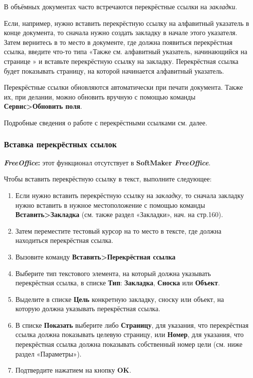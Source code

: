 ﻿\documentclass[a4paper,10pt]{article}
\begin{document}
 В объёмных документах часто встречаются перекрёстные ссылки на \textit{закладки}.
 
 Если, например, нужно вставить перекрёстную ссылку на алфавитный указатель в конце документа, то сначала нужно создать закладку в начале этого указателя. Затем вернитесь в то место в документе, где должна появиться перекрёстная ссылка, введите что-то типа «Также см. алфавитный указатель, начинающийся на странице » и вставьте перекрёстную ссылку на закладку. Перекрёстная ссылка будет показывать страницу, на которой начинается алфавитный указатель.
 
 Перекрёстные ссылки обновляются автоматически при печати документа. Также их, при делании, можно обновить вручную с помощью команды \textbf{Сервис>Обновить поля}.
 
 Подробные сведения о работе с перекрёстными ссылками см. далее.

\subsubsection{Вставка перекрёстных ссылок}
\begin{mdframed}[backgroundcolor=pink!50]
\textbf{\textit{FreeOffice}:} этот функционал отсутствует в \textbf{SoftMaker \textit{FreeOffice}}.
\end{mdframed}

Чтобы вставить перекрёстную ссылку в текст, выполните следующее:

\begin{enumerate}
 \item Если нужно вставить перекрёстную ссылку на \textit{закладку}, то сначала закладку нужно вставить в нужное местоположение с помощью команды \textbf{Вставить>Закладка} (см. также раздел «Закладки», нач. на стр.160).
 \item Затем переместите тестовый курсор на то место в тексте, где должна находиться перекрёстная ссылка.
 \item Вызовите команду \textbf{Вставить>Перекрёстная ссылка}
 \item Выберите тип текстового элемента, на который должна указывать перекрёстная ссылка, в списке \textbf{Тип}: \textbf{Закладка}, \textbf{Сноска} или \textbf{Объект}.
 \item Выделите в списке \textbf{Цель} конкретную закладку, сноску или объект, на которую должна указывать перекрёстная ссылка.
 \item В списке \textbf{Показать} выберите либо \textbf{Страницу}, для указания, что перекрёстная ссылка должна показывать целевую страницу, или \textbf{Номер}, для указания, что перекрёстная ссылка должна показывать собственный номер цели (см. ниже раздел «Параметры»).
 \item Подтвердите нажатием на кнопку \textbf{OK}.
\end{enumerate}
\end{document}
